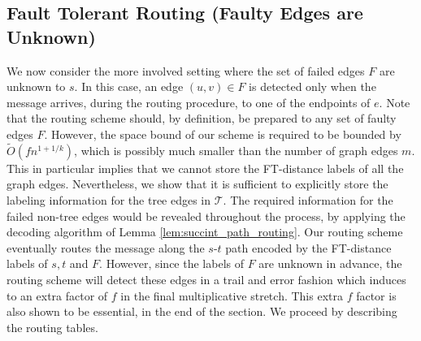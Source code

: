 \subsection{Fault Tolerant Routing (Faulty Edges are Unknown)}\label{sec:route-unknown}
We now consider the more involved setting where the set of failed edges $F$ are unknown to $s$. In this case, an edge $(u,v) \in F$ is detected only when the message arrives, during the routing procedure, to one of the endpoints of $e$. Note that the routing scheme should, by definition, be prepared to any set of faulty edges $F$. However, the space bound of our scheme is required to be bounded by $\widetilde{O}(f n^{1+1/k})$, which is possibly much smaller than the number of graph edges $m$. This in particular implies that we cannot store the FT-distance labels of all the graph edges. Nevertheless, we show that it is sufficient to explicitly store the labeling information for the tree edges in $\mathcal{T}$. The required information for the failed non-tree edges would be revealed throughout the process, by applying the decoding algorithm of Lemma \ref{lem:succint_path_routing}.
Our routing scheme eventually routes the message along the $s$-$t$ path encoded by the FT-distance labels of $s,t$ and $F$. However, since the labels of $F$ are unknown in advance, the routing scheme will detect these edges in a trail and error fashion which induces to an extra factor of $f$ in the final multiplicative stretch. This extra $f$ factor is also shown to be essential, in the end of the section.
We proceed by describing the routing tables.  

